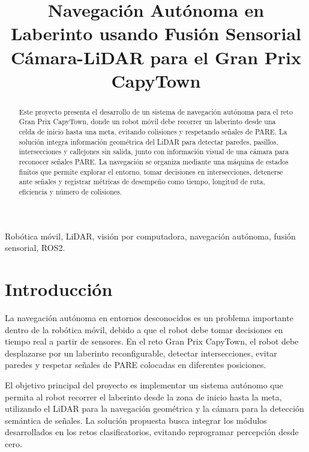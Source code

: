 \documentclass[conference]{IEEEtran}
\begin{document}
\title{Navegación Autónoma en Laberinto usando Fusión Sensorial Cámara-LiDAR para el Gran Prix CapyTown}

\author{
}

\maketitle

\begin{abstract}
Este proyecto presenta el desarrollo de un sistema de navegación autónoma para el reto Gran Prix CapyTown, donde un robot móvil debe recorrer un laberinto desde una celda de inicio hasta una meta, evitando colisiones y respetando señales de PARE. La solución integra información geométrica del LiDAR para detectar paredes, pasillos, intersecciones y callejones sin salida, junto con información visual de una cámara para reconocer señales PARE. La navegación se organiza mediante una máquina de estados finitos que permite explorar el entorno, tomar decisiones en intersecciones, detenerse ante señales y registrar métricas de desempeño como tiempo, longitud de ruta, eficiencia y número de colisiones.
\end{abstract}

\begin{IEEEkeywords}
Robótica móvil, LiDAR, visión por computadora, navegación autónoma, fusión sensorial, ROS2.
\end{IEEEkeywords}

\section{Introducción}

La navegación autónoma en entornos desconocidos es un problema importante dentro de la robótica móvil, debido a que el robot debe tomar decisiones en tiempo real a partir de sensores. En el reto Gran Prix CapyTown, el robot debe desplazarse por un laberinto reconfigurable, detectar intersecciones, evitar paredes y respetar señales de PARE colocadas en diferentes posiciones.

El objetivo principal del proyecto es implementar un sistema autónomo que permita al robot recorrer el laberinto desde la zona de inicio hasta la meta, utilizando el LiDAR para la navegación geométrica y la cámara para la detección semántica de señales. La solución propuesta busca integrar los módulos desarrollados en los retos clasificatorios, evitando reprogramar percepción desde cero.
\end{document}
